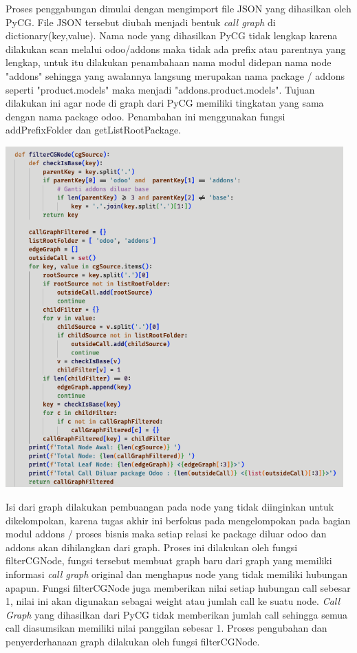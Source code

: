 Proses penggabungan dimulai dengan mengimport file JSON yang dihasilkan oleh PyCG. File JSON tersebut diubah menjadi bentuk \textit{call graph} di dictionary(key,value). Nama node yang dihasilkan PyCG tidak lengkap karena dilakukan scan melalui odoo/addons maka tidak ada prefix atau parentnya yang lengkap, untuk itu dilakukan penambahaan nama modul didepan nama node "addons" sehingga yang awalannya langsung merupakan nama package / addons seperti "product.models" maka menjadi "addons.product.models". Tujuan dilakukan ini agar node di graph dari PyCG memiliki tingkatan yang sama dengan nama package odoo. Penambahan ini menggunakan fungsi addPrefixFolder dan getListRootPackage.

\begin{center}
	\includegraphics[width=13cm]{img/bab_4/ekstraksi_2.png}
	\label{fig:ekstraksi_2}
\end{center}

Isi dari graph dilakukan pembuangan pada node yang tidak diinginkan untuk dikelompokan, karena tugas akhir ini berfokus pada mengelompokan pada bagian modul addons / proses bisnis maka setiap relasi ke package diluar  odoo dan addons akan dihilangkan dari graph. Proses ini dilakukan oleh fungsi filterCGNode, fungsi tersebut membuat graph baru dari graph yang memiliki informasi \textit{call graph} original dan menghapus node yang tidak memiliki hubungan apapun. Fungsi filterCGNode juga memberikan nilai setiap hubungan call sebesar 1, nilai ini akan digunakan sebagai weight atau jumlah call ke suatu node. \textit{Call Graph} yang dihasilkan dari PyCG tidak memberikan jumlah call sehingga semua call diasumsikan memiliki nilai panggilan sebesar 1. Proses pengubahan dan penyerderhanaan graph dilakukan oleh fungsi filterCGNode.

